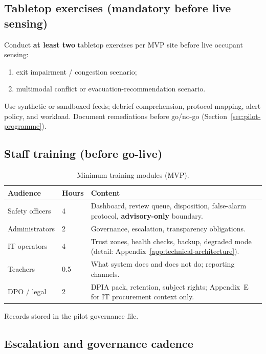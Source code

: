 \subsection{Tabletop exercises (mandatory before live sensing)}

Conduct \textbf{at least two} tabletop exercises per MVP site before live occupant sensing:
\begin{enumerate}[noitemsep]
  \item exit impairment / congestion scenario;
  \item multimodal conflict or evacuation-recommendation scenario.
\end{enumerate}

Use synthetic or sandboxed feeds; debrief comprehension, protocol mapping, alert policy, and
workload.
Document remediations before go/no-go (Section~\ref{sec:pilot-programme}).

\subsection{Staff training (before go-live)}

\begin{table}[htbp]
  \centering
  \caption{Minimum training modules (MVP).}
  \label{tab:training}
  \small
  \begin{tabular}{@{}p{3.0cm}p{1.8cm}p{6.2cm}@{}}
    \toprule
    Audience & Hours & Content \\
    \midrule
    Safety officers & 4 &
      Dashboard, review queue, disposition, false-alarm protocol, \textbf{advisory-only} boundary. \\
    Administrators & 2 &
      Governance, escalation, transparency obligations. \\
    IT operators & 4 &
      Trust zones, health checks, backup, degraded mode (detail: Appendix~\ref{app:technical-architecture}). \\
    Teachers & 0.5 &
      What system does and does not do; reporting channels. \\
DPO / legal & 2 &
      DPIA pack, retention, subject rights; Appendix~E for IT procurement context only. \\
    \bottomrule
  \end{tabular}
\end{table}

Records stored in the pilot governance file.

\subsection{Escalation and governance cadence}

